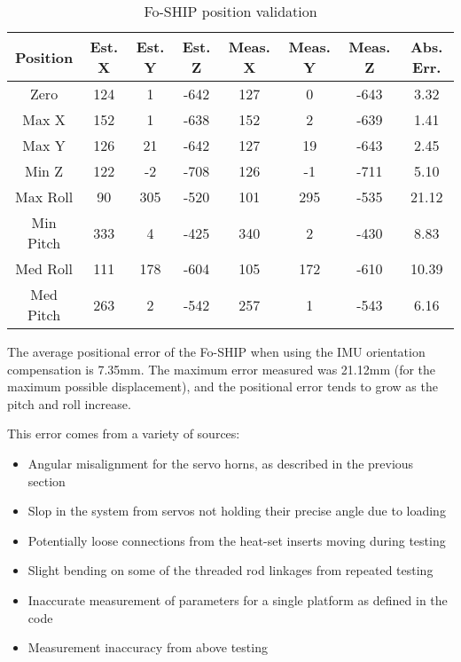 \documentclass[11pt]{ucthesisCP}
\begin{document}
\begin{table}[htbp]
	\centering
	\caption{Fo-SHIP position validation}
	\label{tab:foshipvalid}
	\renewcommand{\arraystretch}{1.2}
	\begin{tabular}{|c|c|c|c|c|c|c|c|}
		\hline
		Position & Est. X & Est. Y & Est. Z & Meas. X & Meas. Y & Meas. Z & Abs. Err. \\
		\hline
		Zero & 124 & 1 & -642 & 127 & 0 & -643 & 3.32 \\
		\hline
		Max X & 152 & 1 & -638 & 152 & 2 & -639 & 1.41 \\
		\hline
		Max Y & 126 & 21 & -642 & 127 & 19 & -643 & 2.45 \\
		\hline
		Min Z & 122 & -2 & -708 & 126 & -1 & -711 & 5.10 \\
		\hline
		Max Roll & 90 & 305 & -520 & 101 & 295 & -535 & 21.12 \\
		\hline
		Min Pitch & 333 & 4 & -425 & 340 & 2 & -430 & 8.83 \\
		\hline
		Med Roll & 111 & 178 & -604 & 105 & 172 & -610 & 10.39 \\
		\hline
		Med Pitch & 263 & 2 & -542 & 257 & 1 & -543 & 6.16 \\
		\hline
	\end{tabular}
\end{table}

The average positional error of the Fo-SHIP when using the IMU orientation compensation is 7.35mm. The maximum error measured was 21.12mm (for the maximum possible displacement), and the positional error tends to grow as the pitch and roll increase.

\noindent This error comes from a variety of sources:

\begin{itemize}[noitemsep,topsep=0pt]
	\item Angular misalignment for the servo horns, as described in the previous section
	\item Slop in the system from servos not holding their precise angle due to loading
	\item Potentially loose connections from the heat-set inserts moving during testing
	\item Slight bending on some of the threaded rod linkages from repeated testing
	\item Inaccurate measurement of parameters for a single platform as defined in the code
	\item Measurement inaccuracy from above testing
\end{itemize}
\end{document}
